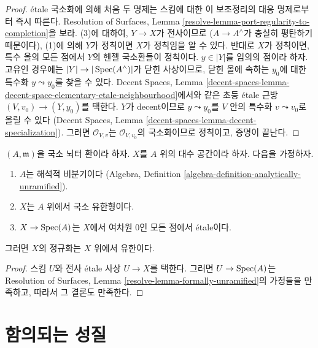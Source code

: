 \begin{proof}
\'etale 국소화에 의해 처음 두 명제는 스킴에 대한 이 보조정리의 대응 명제로부터
즉시 따른다. Resolution of Surfaces, Lemma
\ref{resolve-lemma-port-regularity-to-completion}을 보라.
(3)에 대하여, $Y \to X$가 전사이므로
($A \to A^\wedge$가 충실히 평탄하기 때문이다),
(1)에 의해 $Y$가 정칙이면 $X$가 정칙임을 알 수 있다.
반대로 $X$가 정칙이면, 특수 올의 모든 점에서
$Y$의 헨젤 국소환들이 정칙이다.
$y \in |Y|$를 임의의 점이라 하자. 고유인 경우에는
$|Y| \to |\mathop{\mathrm{Spec}}(A^\wedge)|$가 닫힌 사상이므로,
닫힌 올에 속하는 $y_0$에 대한 특수화 $y \leadsto y_0$를 찾을 수 있다.
Decent Spaces, Lemma
\ref{decent-spaces-lemma-decent-space-elementary-etale-neighbourhood}에서와 같은
초등 \'etale 근방 $(V, v_0) \to (Y, y_0)$를 택한다.
$Y$가 decent이므로 $y \leadsto y_0$를 $V$ 안의 특수화
$v \leadsto v_0$로 올릴 수 있다
(Decent Spaces, Lemma \ref{decent-spaces-lemma-decent-specialization}).
그러면 $\mathcal{O}_{V, v}$는 $\mathcal{O}_{V, v_0}$의 국소화이므로
정칙이고, 증명이 끝난다.
\end{proof}

\begin{lemma}
\label{lemma-formally-unramified}
$(A, \mathfrak m)$을 국소 뇌터 환이라 하자.
$X$를 $A$ 위의 대수 공간이라 하자. 다음을 가정하자.
\begin{enumerate}
\item $A$는 해석적 비분기이다
(Algebra, Definition \ref{algebra-definition-analytically-unramified}).
\item $X$는 $A$ 위에서 국소 유한형이다.
\item $X \to \mathop{\mathrm{Spec}}(A)$는 $X$에서 여차원 $0$인 모든 점에서 \'etale이다.
\end{enumerate}
그러면 $X$의 정규화는 $X$ 위에서 유한이다.
\end{lemma}

\begin{proof}
스킴 $U$와 전사 \'etale 사상 $U \to X$를 택한다.
그러면 $U \to \mathop{\mathrm{Spec}}(A)$는 Resolution of Surfaces, Lemma
\ref{resolve-lemma-formally-unramified}의 가정들을 만족하고,
따라서 그 결론도 만족한다.
\end{proof}





\section{함의되는 성질}
\label{section-existence-gives}

